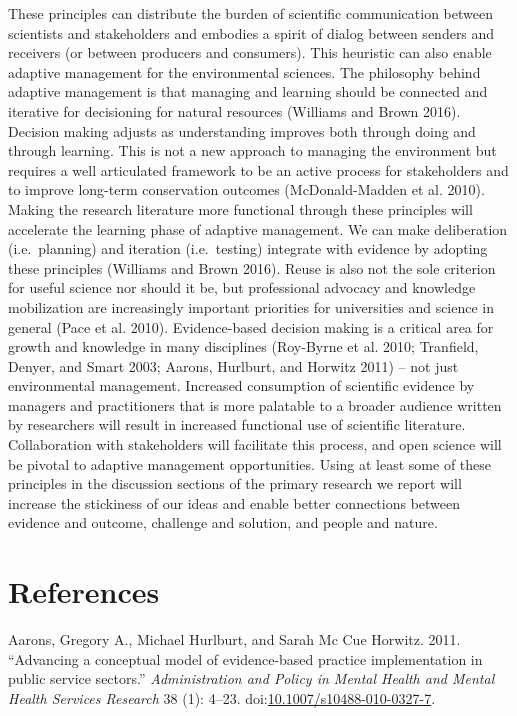 \documentclass[fleqn,10pt]{wlpeerj} %
\begin{document}
These principles can distribute the burden of scientific communication
between scientists and stakeholders and embodies a spirit of dialog
between senders and receivers (or between producers and consumers). This
heuristic can also enable adaptive management for the environmental
sciences. The philosophy behind adaptive management is that managing and
learning should be connected and iterative for decisioning for natural
resources (Williams and Brown 2016). Decision making adjusts as
understanding improves both through doing and through learning. This is
not a new approach to managing the environment but requires a well
articulated framework to be an active process for stakeholders and to
improve long-term conservation outcomes (McDonald-Madden et al. 2010).
Making the research literature more functional through these principles
will accelerate the learning phase of adaptive management. We can make
deliberation (i.e.~planning) and iteration (i.e.~testing) integrate with
evidence by adopting these principles (Williams and Brown 2016). Reuse
is also not the sole criterion for useful science nor should it be, but
professional advocacy and knowledge mobilization are increasingly
important priorities for universities and science in general (Pace et
al. 2010). Evidence-based decision making is a critical area for growth
and knowledge in many disciplines (Roy-Byrne et al. 2010; Tranfield,
Denyer, and Smart 2003; Aarons, Hurlburt, and Horwitz 2011) -- not just
environmental management. Increased consumption of scientific evidence
by managers and practitioners that is more palatable to a broader
audience written by researchers will result in increased functional use
of scientific literature. Collaboration with stakeholders will
facilitate this process, and open science will be pivotal to adaptive
management opportunities. Using at least some of these principles in the
discussion sections of the primary research we report will increase the
stickiness of our ideas and enable better connections between evidence
and outcome, challenge and solution, and people and nature.

\section*{References}\label{references}

\hypertarget{refs}{}
\hypertarget{ref-Aarons2011}{}
Aarons, Gregory A., Michael Hurlburt, and Sarah Mc Cue Horwitz. 2011.
``Advancing a conceptual model of evidence-based practice implementation
in public service sectors.'' \emph{Administration and Policy in Mental
Health and Mental Health Services Research} 38 (1): 4--23.
doi:\href{https://doi.org/10.1007/s10488-010-0327-7}{10.1007/s10488-010-0327-7}.
\end{document}
